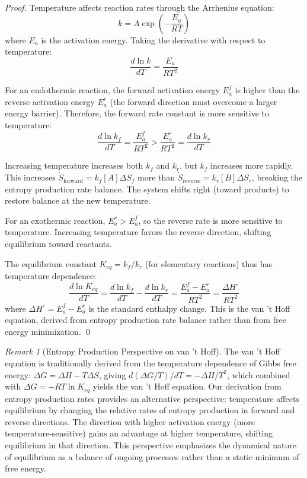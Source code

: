 \documentclass[12pt,a4paper]{article}
\theoremstyle{definition}
\theoremstyle{remark}
\newtheorem{remark}[theorem]{Remark}
\begin{document}
\begin{proof}
Temperature affects reaction rates through the Arrhenius equation:
\begin{equation}
k = A \exp\left(-\frac{E_a}{RT}\right)
\end{equation}
where $E_a$ is the activation energy. Taking the derivative with respect to temperature:
\begin{equation}
\frac{d \ln k}{dT} = \frac{E_a}{RT^2}
\end{equation}

For an endothermic reaction, the forward activation energy $E_a^f$ is higher than the reverse activation energy $E_a^r$ (the forward direction must overcome a larger energy barrier). Therefore, the forward rate constant is more sensitive to temperature:
\begin{equation}
\frac{d \ln k_f}{dT} = \frac{E_a^f}{RT^2} > \frac{E_a^r}{RT^2} = \frac{d \ln k_r}{dT}
\end{equation}

Increasing temperature increases both $k_f$ and $k_r$, but $k_f$ increases more rapidly. This increases $\dot{S}_{\text{forward}} = k_f [A] \Delta S_f$ more than $\dot{S}_{\text{reverse}} = k_r [B] \Delta S_r$, breaking the entropy production rate balance. The system shifts right (toward products) to restore balance at the new temperature.

For an exothermic reaction, $E_a^r > E_a^f$, so the reverse rate is more sensitive to temperature. Increasing temperature favors the reverse direction, shifting equilibrium toward reactants.

The equilibrium constant $K_{eq} = k_f / k_r$ (for elementary reactions) thus has temperature dependence:
\begin{equation}
\frac{d \ln K_{eq}}{dT} = \frac{d \ln k_f}{dT} - \frac{d \ln k_r}{dT} = \frac{E_a^f - E_a^r}{RT^2} = \frac{\Delta H^\circ}{RT^2}
\end{equation}
where $\Delta H^\circ = E_a^f - E_a^r$ is the standard enthalpy change. This is the van 't Hoff equation, derived from entropy production rate balance rather than from free energy minimization. \qed
\end{proof}

\begin{remark}[Entropy Production Perspective on van 't Hoff]
\label{rem:vant_hoff_entropy}
The van 't Hoff equation is traditionally derived from the temperature dependence of Gibbs free energy: $\Delta G = \Delta H - T \Delta S$, giving $d(\Delta G / T) / dT = -\Delta H / T^2$, which combined with $\Delta G = -RT \ln K_{eq}$ yields the van 't Hoff equation. Our derivation from entropy production rates provides an alternative perspective: temperature affects equilibrium by changing the relative rates of entropy production in forward and reverse directions. The direction with higher activation energy (more temperature-sensitive) gains an advantage at higher temperature, shifting equilibrium in that direction. This perspective emphasizes the dynamical nature of equilibrium as a balance of ongoing processes rather than a static minimum of free energy.
\end{remark}
\end{document}
